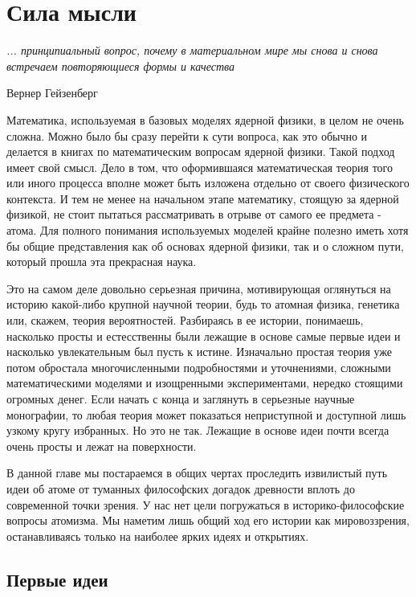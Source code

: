 \chapter{Сила мысли}\label{ch:power_of_thought}

\epigraph{\emph{... принципиальный вопрос, почему в материальном мире мы снова и снова встречаем повторяющиеся формы и качества}}
{Вернер Гейзенберг}


Математика, используемая в базовых моделях ядерной физики, в целом не очень сложна.
Можно было бы сразу перейти к сути вопроса, как это обычно и делается в книгах по математическим вопросам ядерной физики.
Такой подход имеет свой смысл.
Дело в том, что оформившаяся математическая теория того или иного процесса вполне может быть изложена отдельно от своего физического контекста.
И тем не менее на начальном этапе математику, стоящую за ядерной физикой, не стоит пытаться рассматривать в отрыве от самого ее предмета - атома.
Для полного понимания используемых моделей крайне полезно иметь хотя бы общие представления как об основах ядерной физики, так и о сложном пути, который прошла эта прекрасная наука.

Это на самом деле довольно серьезная причина, мотивирующая оглянуться на историю какой-либо крупной научной теории, будь то атомная физика, генетика или, скажем, теория вероятностей.
Разбираясь в ее истории, понимаешь, насколько просты и естесственны были лежащие в основе самые первые идеи и насколько увлекательным был пусть к истине. 
Изначально простая теория уже потом обростала многочисленными подробностями и уточнениями, сложными математическими моделями и изощренными экспериментами, нередко стоящими огромных денег.
Если начать с конца и заглянуть в серьезные научные монографии, то любая теория может показаться неприступной и доступной лишь узкому кругу избранных.  
Но это не так.
Лежащие в основе идеи почти всегда очень просты и лежат на поверхности.

В данной главе мы постараемся в общих чертах проследить извилистый путь идеи об атоме от туманных философских догадок древности вплоть до современной точки зрения. 
У нас нет цели погружаться в историко-философские вопросы атомизма.
Мы наметим лишь общий ход его истории как мировоззрения, останавливаясь только на наиболее ярких идеях и открытиях.


\section*{Первые идеи}


